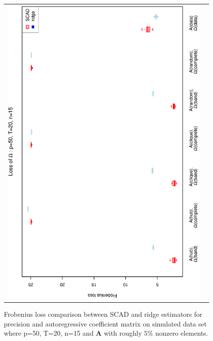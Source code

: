 \documentclass[a4paper]{article}
\begin{document}
\begin{figure}[h!]
\begin{tabular}{cc}
\includegraphics[scale=0.45,angle=270]{LossOmega50T20N15_5.eps}
\end{tabular}
\caption{Frobenius loss comparison between SCAD and ridge estimators for precision and autoregressive coefficient matrix on simulated data set where p=50, T=20, n=15  and $\mathbf{A}$ with roughly $5\%$ nonzero elements.}
\label{figSM:Loss50T20N15_5}
\end{figure}
\clearpage

\end{document}
